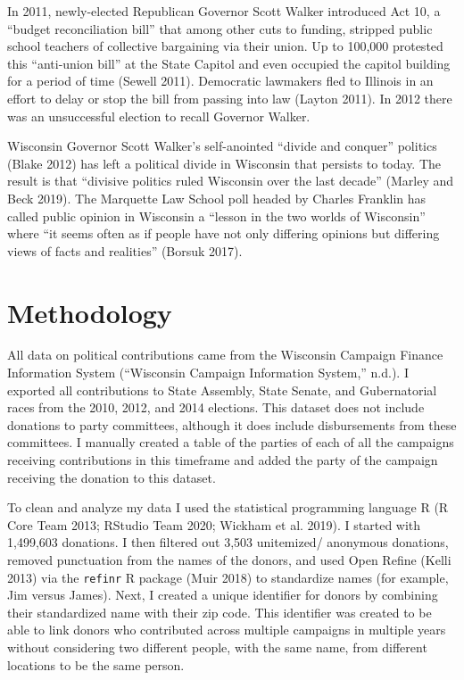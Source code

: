 \documentclass[12pt,]{article}
\begin{document}
In 2011, newly-elected Republican Governor Scott Walker introduced Act
10, a ``budget reconciliation bill'' that among other cuts to funding,
stripped public school teachers of collective bargaining via their
union. Up to 100,000 protested this ``anti-union bill'' at the State
Capitol and even occupied the capitol building for a period of time
(Sewell 2011). Democratic lawmakers fled to Illinois in an effort to
delay or stop the bill from passing into law (Layton 2011). In 2012
there was an unsuccessful election to recall Governor Walker.

Wisconsin Governor Scott Walker's self-anointed ``divide and conquer''
politics (Blake 2012) has left a political divide in Wisconsin that
persists to today. The result is that ``divisive politics ruled
Wisconsin over the last decade'' (Marley and Beck 2019). The Marquette
Law School poll headed by Charles Franklin has called public opinion in
Wisconsin a ``lesson in the two worlds of Wisconsin'' where ``it seems
often as if people have not only differing opinions but differing views
of facts and realities'' (Borsuk 2017).

\hypertarget{methodology}{%
\section{Methodology}\label{methodology}}

All data on political contributions came from the Wisconsin Campaign
Finance Information System (``Wisconsin Campaign Information System,''
n.d.). I exported all contributions to State Assembly, State Senate, and
Gubernatorial races from the 2010, 2012, and 2014 elections. This
dataset does not include donations to party committees, although it does
include disbursements from these committees. I manually created a table
of the parties of each of all the campaigns receiving contributions in
this timeframe and added the party of the campaign receiving the
donation to this dataset.

To clean and analyze my data I used the statistical programming language
R (R Core Team 2013; RStudio Team 2020; Wickham et al. 2019). I started
with 1,499,603 donations. I then filtered out 3,503 unitemized/
anonymous donations, removed punctuation from the names of the donors,
and used Open Refine (Kelli 2013) via the \texttt{refinr} R package
(Muir 2018) to standardize names (for example, Jim versus James). Next,
I created a unique identifier for donors by combining their standardized
name with their zip code. This identifier was created to be able to link
donors who contributed across multiple campaigns in multiple years
without considering two different people, with the same name, from
different locations to be the same person.
\end{document}
